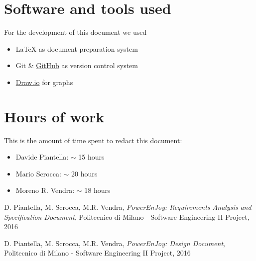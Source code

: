\begin{appendices}

	\section{Software and tools used}
	For the development of this document we used
	\begin{itemize}
		\item \LaTeX{} as document preparation system
		\item Git \& \href{http://github.com}{GitHub} as version control system
		\item \href{http://draw.io}{Draw.io} for graphs 
	\end{itemize}
	
	\section{Hours of work}
	This is the amount of time spent to redact this document:
	\begin{itemize}
		\item Davide Piantella: $\sim$ 15 hours
		\item Mario Scrocca: $\sim$ 20 hours
		\item Moreno R. Vendra: $\sim$ 18 hours
	\end{itemize}
	
\end{appendices}


\begin{thebibliography}{9}

D. Piantella, M. Scrocca, M.R. Vendra, \emph{PowerEnJoy: Requirements Analysis and Specification Document}, Politecnico di Milano - Software Engineering II Project, 2016

D. Piantella, M. Scrocca, M.R. Vendra, \emph{PowerEnJoy: Design Document}, Politecnico di Milano - Software Engineering II Project, 2016

\end{thebibliography}
